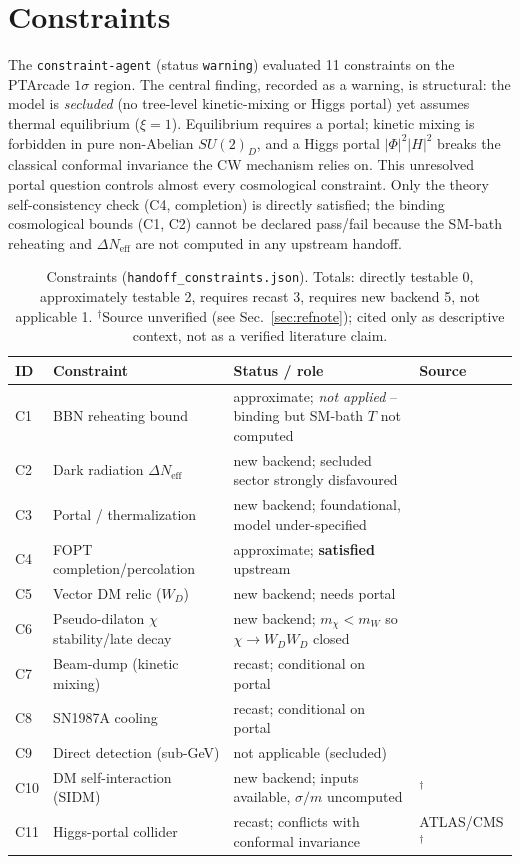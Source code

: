 \documentclass[11pt]{article}
\newcommand{\Neff}{N_{\mathrm{eff}}}
\begin{document}
\section{Constraints}
\label{sec:constraints}
The \texttt{constraint-agent} (status \texttt{warning}) evaluated 11 constraints on the PTArcade
$1\sigma$ region. The central finding, recorded as a warning, is structural: the model is
\emph{secluded} (no tree-level kinetic-mixing or Higgs portal) yet assumes thermal equilibrium
($\xi=1$). Equilibrium requires a portal; kinetic mixing is forbidden in pure non-Abelian $SU(2)_D$,
and a Higgs portal $|\Phi|^2|H|^2$ breaks the classical conformal invariance the CW mechanism relies
on. This unresolved portal question controls almost every cosmological constraint. Only the theory
self-consistency check (C4, completion) is directly satisfied; the binding cosmological bounds
(C1, C2) cannot be declared pass/fail because the SM-bath reheating and $\Delta\Neff$ are not computed
in any upstream handoff.

\begin{table}[h]
\centering
\small
\begin{tabular}{@{}llp{6.0cm}l@{}}
\toprule
ID & Constraint & Status / role & Source \\
\midrule
C1 & BBN reheating bound & approximate; \emph{not applied} -- binding but SM-bath $T$ not computed & \cite{Bai2021,deSalas2015} \\
C2 & Dark radiation $\Delta\Neff$ & new backend; secluded sector strongly disfavoured & \cite{Bringmann2023} \\
C3 & Portal / thermalization & new backend; foundational, model under-specified & \cite{Balan2025} \\
C4 & FOPT completion/percolation & approximate; \textbf{satisfied} upstream & \cite{Goncalves2025} \\
C5 & Vector DM relic ($W_D$) & new backend; needs portal & \cite{Borah2021} \\
C6 & Pseudo-dilaton $\chi$ stability/late decay & new backend; $m_\chi<m_W$ so $\chi\to W_DW_D$ closed & \cite{Balan2025} \\
C7 & Beam-dump (kinetic mixing) & recast; conditional on portal & \cite{BeamDump2025} \\
C8 & SN1987A cooling & recast; conditional on portal & \cite{Kazanas2014} \\
C9 & Direct detection (sub-GeV) & not applicable (secluded) & \cite{Balan2025} \\
C10 & DM self-interaction (SIDM) & new backend; inputs available, $\sigma/m$ uncomputed & \cite{TulinYu2018}$^{\dagger}$ \\
C11 & Higgs-portal collider & recast; conflicts with conformal invariance & ATLAS/CMS$^{\dagger}$ \\
\bottomrule
\end{tabular}
\caption{Constraints (\texttt{handoff\_constraints.json}). Totals: directly testable 0, approximately
testable 2, requires recast 3, requires new backend 5, not applicable 1.
$^{\dagger}$Source unverified (see Sec.~\ref{sec:refnote}); cited only as descriptive context, not as a
verified literature claim.}
\label{tab:constraints}
\end{table}
\end{document}
